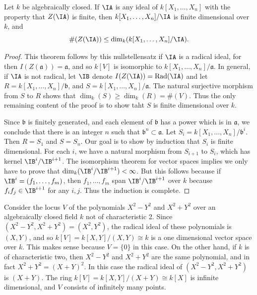 \begin{lemma}
    Let $k$ be algebraically closed. If $\IA$ is any ideal of $k[X_1,\dots,X_n]$ with the property that $Z(\IA)$ is finite, then $k[X_1,\dots,X_n] / \IA$ is finite dimensional over $k$, and
    \[ \#(Z(\IA)) \leq \dim_k(k[X_1,\dots,X_n]/ \IA). \]
\end{lemma}
\begin{proof}
    This theorem follows by this nullstellensatz if $\IA$ is a radical ideal, for then $I(Z(\mathfrak{a})) = \mathfrak{a}$, and so $k[V]$ is isomorphic to $k[X_1, \dots, X_n]/\mathfrak{a}$. In general, if $\IA$ is not radical, let $\IB$ denote $I(Z(\IA)) = \text{Rad}(\IA)$ and let $R = k[X_1,\dots,X_n]/\mathfrak{b}$, and $S = k[X_1,\dots,X_n]/\mathfrak{a}$. The natural surjective morphism from $S$ to $R$ shows that $\dim_k(S) \geq \dim_k(R) = \#(V)$. Thus the only remaining content of the proof is to show taht $S$ is finite dimensional over $k$.

    Since $\mathfrak{b}$ is finitely generated, and each element of $\mathfrak{b}$ has a power which is in $\mathfrak{a}$, we conclude that there is an integer $n$ such that $\mathfrak{b}^n \subset \mathfrak{a}$. Let $S_i = k[X_1,\dots,X_n]/\mathfrak{b}^i$. Then $R = S_1$ and $S = S_n$. Our goal is to show by induction that $S_i$ is finite dimensional. For each $i$, we have a natural morphism from $S_{i+1}$ to $S_i$, which has kernel $\IB^i/\IB^{i+1}$. The isomorphism theorem for vector spaces implies we only have to prove that $\dim_k(\IB^i/\IB^{i+1}) < \infty$. But this follows because if $\IB^i = (f_1,\dots,f_m)$, then $f_1,\dots,f_m$ span $\IB^i/\IB^{i+1}$ over $k$ because $f_if_j \in \IB^{i+1}$ for any $i,j$. Thus the induction is complete.
\end{proof}

\begin{example}
    Consider the locus $V$ of the polynomials $X^2 - Y^2$ and $X^2 + Y^2$ over an algebraically closed field $k$ not of characteristic 2. Since $(X^2 - Y^2, X^2 + Y^2) = (X^2,Y^2)$, the radical ideal of these polynomials is $(X,Y)$, and so $k[V] = k[X,Y]/(X,Y) \cong k$ is a one dimensional vector space over $k$. This makes sense because $V = \{ 0 \}$ in this case.  On the other hand, if $k$ is of characteristic two, then $X^2 - Y^2$ and $X^2 + Y^2$ are the same polynomial, and in fact $X^2 + Y^2 = (X + Y)^2$. In this case the radical ideal of $(X^2 - Y^2, X^2 + Y^2)$ is $(X + Y)$. The ring $k[V] = k[X,Y]/(X+Y) \cong k[X]$ is infinite dimensional, and $V$ consists of infinitely many points.
\end{example}

